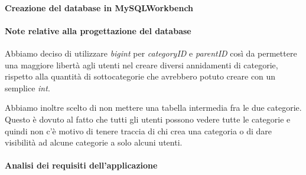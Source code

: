 \hypertarget{creazione-del-database-in-mysqlworkbench}{%
\paragraph{Creazione del database in
MySQLWorkbench}\label{creazione-del-database-in-mysqlworkbench}}

\begin{Shaded}
\begin{Highlighting}[]
  \NormalTok{ (}
 \NormalTok{,}
\NormalTok{(}\NormalTok{) } \NormalTok{,}
 \NormalTok{,}
   
\NormalTok{)}

  \NormalTok{ (}
\NormalTok{(}\NormalTok{) } \NormalTok{,}
   \NormalTok{(}\NormalTok{) } \NormalTok{,}
   
\NormalTok{) }
\end{Highlighting}
\end{Shaded}

\hypertarget{note-relative-alla-progettazione-del-database}{%
\paragraph{Note relative alla progettazione del
database}\label{note-relative-alla-progettazione-del-database}}

Abbiamo deciso di utilizzare \emph{bigint} per \emph{categoryID} e
\emph{parentID} così da permettere una maggiore libertà agli utenti nel
creare diversi annidamenti di categorie, rispetto alla quantità di
sottocategorie che avrebbero potuto creare con un semplice \emph{int}.

Abbiamo inoltre scelto di non mettere una tabella intermedia fra le due
categorie. Questo è dovuto al fatto che tutti gli utenti possono vedere
tutte le categorie e quindi non c'è motivo di tenere traccia di chi crea
una categoria o di dare visibilità ad alcune categorie a solo alcuni
utenti.

\hypertarget{analisi-dei-requisiti-dellapplicazione}{%
\paragraph{Analisi dei requisiti
dell'applicazione}\label{analisi-dei-requisiti-dellapplicazione}}

